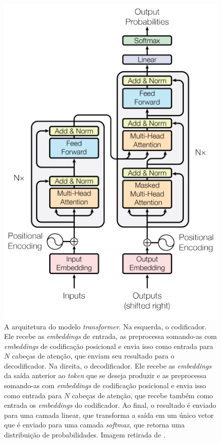 \begin{figure}[h]
\centering
\includegraphics[scale=0.6]{Res/transformers-img1.jpg}
\caption{A arquitetura do modelo \textit{transformer}. Na esquerda, o
codificador. Ele recebe as \textit{embeddings} de entrada, as preprocessa
somando-as com \textit{embeddings} de codificação posicional e envia isso como
entrada para $N$ cabeças de atenção, que enviam seu resultado para o
decodificador. Na direita, o decodificador. Ele recebe as \textit{embeddings} da
saída anterior ao \textit{token} que se deseja produzir e as preprocessa
somando-as com \textit{embeddings} de codificação posicional e envia isso como
entrada para $N$ cabeças de atenção, que recebe também como entrada os
\textit{embeddings} do codificador. Ao final, o resultado é enviado para uma
camada linear, que transforma a saída em um único vetor que é enviado para uma
camada \textit{softmax}, que retorna uma distribuição de probabilidades. Imagem
retirada de \cite{vaswani-etal:2017:attention-is-all-you-need}.}
\label{transformers-img1.jpg}
\end{figure}

